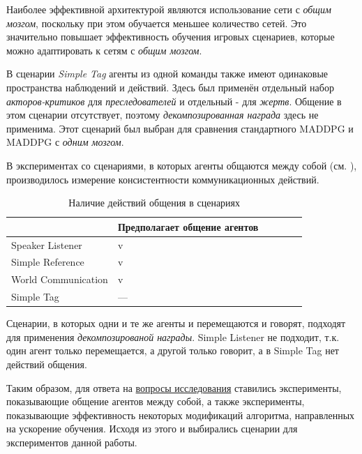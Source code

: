 Наиболее эффективной архитектурой являются использование сети с \textit{общим мозгом}, поскольку при этом обучается меньшее количество сетей. Это значительно повышает эффективность обучения игровых сценариев, которые можно адаптировать к сетям с \textit{общим мозгом}.

В сценарии \textit{Simple Tag} агенты из одной команды также имеют одинаковые пространства наблюдений и действий. Здесь был применён отдельный набор \textit{акторов-критиков} для \textit{преследователей} и отдельный - для \textit{жертв}. Общение в этом сценарии отсутствует, поэтому \textit{декомпозированная награда} здесь не применима. Этот сценарий был выбран для сравнения стандартного MADDPG и MADDPG с \textit{одним мозгом}.

В экспериментах со сценариями, в которых агенты общаются между собой (см. ), производилось измерение консистентности коммуникационных действий.

\begin{table}[t!]
    \centering\small
    \caption{Наличие действий общения в сценариях}
    \label{tab-communicational-scenarious}
    \begin{tabular}{|l|l|l|l|l|l|}
        \hline
        & Предполагает общение агентов \\
        \hline
        Speaker Listener    & v                            \\
        \hline
        Simple Reference    & v                            \\
        \hline
        World Communication & v                            \\
        \hline
        Simple Tag          & ---                          \\
        \hline
    \end{tabular}
    \normalsize%
\end{table}

Сценарии, в которых одни и те же агенты и перемещаются и говорят, подходят для применения \textit{декомпозированой награды}. Simple Listener не подходит, т.к. один агент только перемещается, а другой только говорит, а в Simple Tag нет действий общения.

Таким образом, для ответа на \hyperref[intro-questions]{вопросы исследования} ставились эксперименты, показывающие общение агентов между собой, а также эксперименты, показывающие эффективность некоторых модификаций алгоритма, направленных на ускорение обучения. Исходя из этого и выбирались сценарии для экспериментов данной работы.

\newpage
